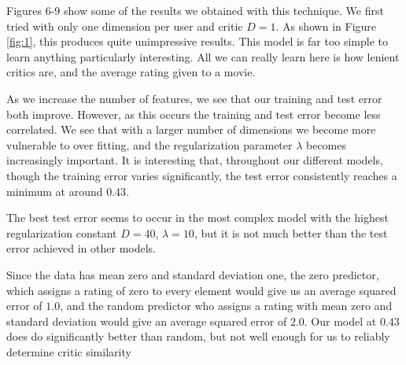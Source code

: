 \documentclass[12pt]{article}
\begin{document}
Figures 6-9 show some of the results we obtained with this technique. We first 
tried with only one dimension per user and critic $D=1$. As shown in Figure 
\ref{fig:1}, this produces quite unimpressive results. This model is far too 
simple to learn anything particularly interesting. All we can really learn here 
is how lenient critics are, and the average rating given to a movie.

As we increase the number of features, we see that our training and test error 
both improve. However, as this occurs the training and test error become less 
correlated. We see that with a larger number of dimensions we become more 
vulnerable to over fitting, and the regularization parameter $\lambda$ becomes 
increasingly important. It is interesting that, throughout our different 
models, though the training error varies significantly, the test error 
consistently reaches a minimum at around $0.43$. 

The best test error seems to occur in the most complex model with the highest 
regularization constant $D=40$, $\lambda = 10$, but it is not much better than 
the test error achieved in other models.

Since the data has mean zero and standard deviation one, the zero predictor, 
which assigns a rating of zero to every element would give us an average 
squared error of $1.0$, and the random predictor who assigns a rating with 
mean zero and standard deviation would give an average squared error of $2.0$. 
Our model at $0.43$ does do significantly better than random, but not well 
enough for us to reliably determine critic similarity
\end{document}
